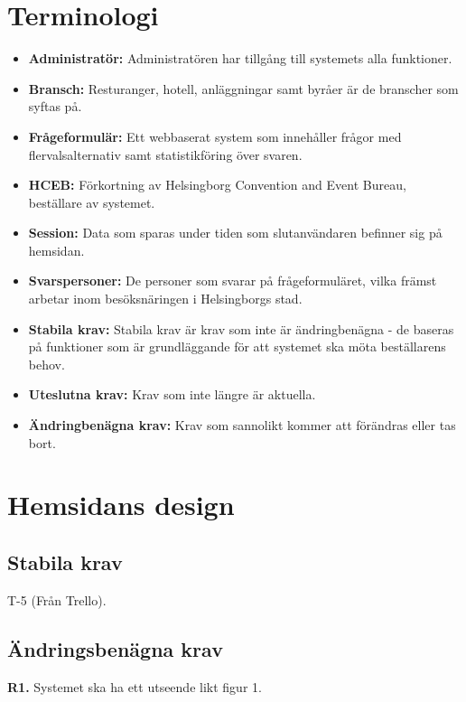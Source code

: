 \documentclass{article}
\begin{document}
    \section{Terminologi}
    \begin{itemize}
        \item \textbf{Administratör:} Administratören har tillgång till systemets alla funktioner.
        \item \textbf{Bransch:} Resturanger, hotell, anläggningar samt byråer är de branscher som syftas på.
         \item \textbf{Frågeformulär:} Ett webbaserat system som innehåller frågor med flervalsalternativ samt statistikföring över svaren.
        \item \textbf{HCEB:} Förkortning av Helsingborg Convention and Event Bureau, beställare av systemet.
        \item \textbf{Session:} Data som sparas under tiden som slutanvändaren befinner sig på hemsidan.
        \item \textbf{Svarspersoner:}  De personer som svarar på frågeformuläret, vilka främst arbetar inom besöksnäringen i Helsingborgs stad. 
        \item\textbf{Stabila krav:}  Stabila krav är krav som inte är ändringbenägna - de baseras på funktioner som är grundläggande för att systemet ska möta beställarens behov.
         \item \textbf{Uteslutna krav:}  Krav som inte längre är aktuella.
        \item \textbf{Ändringbenägna krav:}  Krav som sannolikt kommer att förändras eller tas bort.
       
    \end{itemize}
    \newpage
    \section{Hemsidans design}
    
    \subsection{Stabila krav}
    
    T-5 (Från Trello).
     
    \subsection{Ändringsbenägna krav}
    
    \large{\textbf{R1.}}
    \normalsize{Systemet ska ha ett utseende likt figur 1.}
    
\end{document}
